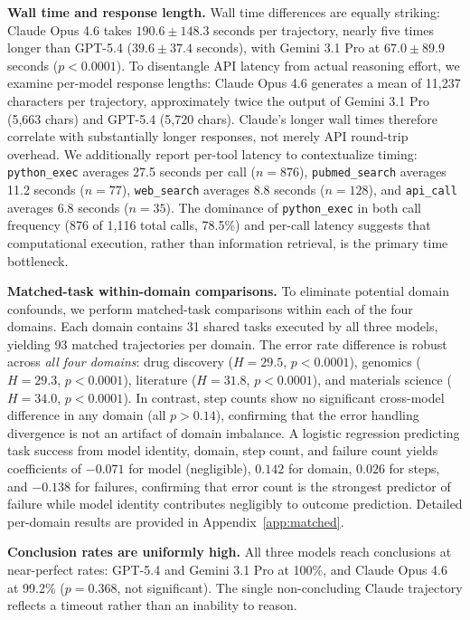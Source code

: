\documentclass{article}
\begin{document}
\textbf{Wall time and response length.} Wall time differences are equally striking: Claude Opus 4.6 takes $190.6 \pm 148.3$ seconds per trajectory, nearly five times longer than GPT-5.4 ($39.6 \pm 37.4$ seconds), with Gemini 3.1 Pro at $67.0 \pm 89.9$ seconds ($p<0.0001$). To disentangle API latency from actual reasoning effort, we examine per-model response lengths: Claude Opus 4.6 generates a mean of 11,237 characters per trajectory, approximately twice the output of Gemini 3.1 Pro (5,663 chars) and GPT-5.4 (5,720 chars). Claude's longer wall times therefore correlate with substantially longer responses, not merely API round-trip overhead. We additionally report per-tool latency to contextualize timing: \texttt{python\_exec} averages 27.5 seconds per call ($n=876$), \texttt{pubmed\_search} averages 11.2 seconds ($n=77$), \texttt{web\_search} averages 8.8 seconds ($n=128$), and \texttt{api\_call} averages 6.8 seconds ($n=35$). The dominance of \texttt{python\_exec} in both call frequency (876 of 1,116 total calls, 78.5\%) and per-call latency suggests that computational execution, rather than information retrieval, is the primary time bottleneck.

\textbf{Matched-task within-domain comparisons.} To eliminate potential domain confounds, we perform matched-task comparisons within each of the four domains. Each domain contains 31 shared tasks executed by all three models, yielding 93 matched trajectories per domain. The error rate difference is robust across \emph{all four domains}: drug discovery ($H=29.5$, $p<0.0001$), genomics ($H=29.3$, $p<0.0001$), literature ($H=31.8$, $p<0.0001$), and materials science ($H=34.0$, $p<0.0001$). In contrast, step counts show no significant cross-model difference in any domain (all $p > 0.14$), confirming that the error handling divergence is not an artifact of domain imbalance. A logistic regression predicting task success from model identity, domain, step count, and failure count yields coefficients of $-0.071$ for model (negligible), $0.142$ for domain, $0.026$ for steps, and $-0.138$ for failures, confirming that error count is the strongest predictor of failure while model identity contributes negligibly to outcome prediction. Detailed per-domain results are provided in Appendix~\ref{app:matched}.

\textbf{Conclusion rates are uniformly high.} All three models reach conclusions at near-perfect rates: GPT-5.4 and Gemini 3.1 Pro at 100\%, and Claude Opus 4.6 at 99.2\% ($p=0.368$, not significant). The single non-concluding Claude trajectory reflects a timeout rather than an inability to reason.
\end{document}
